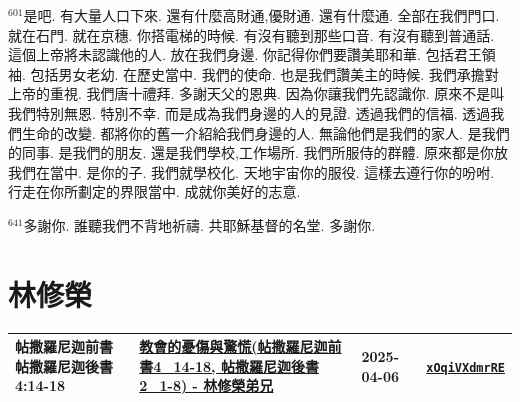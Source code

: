 \documentclass{book}
\begin{document}
$^{601}$是吧.
有大量人口下來.
還有什麼高財通,優財通.
還有什麼通.
全部在我們門口.
就在石門.
就在京穗.
你搭電梯的時候.
有沒有聽到那些口音.
有沒有聽到普通話.
這個上帝將未認識他的人.
放在我們身邊.
你記得你們要讚美耶和華.
包括君王領袖.
包括男女老幼.
在歷史當中.
我們的使命.
也是我們讚美主的時候.
我們承擔對上帝的重視.
我們唐十禮拜.
多謝天父的恩典.
因為你讓我們先認識你.
原來不是叫我們特別無恩.
特別不幸.
而是成為我們身邊的人的見證.
透過我們的信福.
透過我們生命的改變.
都將你的舊一介紹給我們身邊的人.
無論他們是我們的家人.
是我們的同事.
是我們的朋友.
還是我們學校,工作場所.
我們所服侍的群體.
原來都是你放我們在當中.
是你的子.
我們就學校化.
天地宇宙你的服役.
這樣去遵行你的吩咐.
行走在你所劃定的界限當中.
成就你美好的志意.

$^{641}$多謝你.
誰聽我們不背地祈禱.
共耶穌基督的名堂.
多謝你.
\newpage



\chapter{林修榮}\label{ch:preacher6}
\begin{multicols}{3}
\minitoc
\end{multicols}
{ \scriptsize


\begin{xltabular}{\textwidth}{|p{0.15\textwidth} p{0.6\textwidth}|p{0.07\textwidth} p{0.1\textwidth}|}
\hline
帖撒羅尼迦前書帖撒羅尼迦後書 4:14-18 & \hyperref[sec:xOqiVXdmrRE]{教會的憂傷與驚慌(帖撒羅尼迦前書4\_14-18, 帖撒羅尼迦後書2\_1-8) - 林修榮弟兄} & 2025-04-06 & \href{https://youtube.com/watch?v=xOqiVXdmrRE}{\texttt{xOqiVXdmrRE}} \\
\hline
\end{xltabular}
}
\newpage
\end{document}
